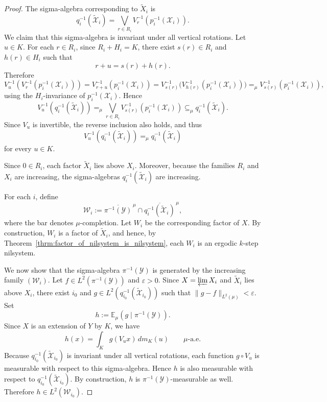 \documentclass[12pt]{amsart}
\theoremstyle{plain}
\theoremstyle{definition}
\newcommand\E{\mathbb{E}}
\newcommand\eps{\varepsilon}
\begin{document}
\begin{proof}
    The sigma-algebra corresponding to $\widetilde X_i$ is
    \[
    q_i^{-1}(\widetilde{\mathcal X}_i)
    = \bigvee_{r\in R_i} V_r^{-1}(p_i^{-1}(\mathcal X_i)).
    \]
    We claim that this sigma-algebra is invariant under all vertical rotations.
    Let $u\in K$.
    For each $r\in R_i$, since $R_i+H_i=K$, there exist $s(r)\in R_i$ and $h(r)\in H_i$ such that
    \[
    r+u=s(r)+h(r).
    \]
    Therefore
    \[
    V_u^{-1}(V_r^{-1}(p_i^{-1}(\mathcal X_i)))
    =V_{r+u}^{-1}(p_i^{-1}(\mathcal X_i))
    =V_{s(r)}^{-1}\bigl(V_{h(r)}^{-1}(p_i^{-1}(\mathcal X_i))\bigr)
    =_\mu V_{s(r)}^{-1}(p_i^{-1}(\mathcal X_i)),
    \]
    using the $H_i$-invariance of $p_i^{-1}(\mathcal X_i)$.
    Hence
    \[
    V_u^{-1}(q_i^{-1}(\widetilde{\mathcal X}_i))
    =_\mu \bigvee_{r\in R_i} V_{s(r)}^{-1}(p_i^{-1}(\mathcal X_i))
    \subseteq_\mu q_i^{-1}(\widetilde{\mathcal X}_i).
    \]
    Since $V_u$ is invertible, the reverse inclusion also holds, and thus
    \[
    V_u^{-1}(q_i^{-1}(\widetilde{\mathcal X}_i)) =_\mu q_i^{-1}(\widetilde{\mathcal X}_i)
    \]
    for every $u\in K$.

    Since $0\in R_i$, each factor $\widetilde X_i$ lies above $X_i$.
    Moreover, because the families $R_i$ and $X_i$ are increasing, the sigma-algebras $q_i^{-1}(\widetilde{\mathcal X}_i)$ are increasing.

    For each $i$, define
    \[
    \mathcal W_i
    := \overline{\pi^{-1}(\mathcal Y)}^{\,\mu}\cap
       \overline{q_i^{-1}(\widetilde{\mathcal X}_i)}^{\,\mu},
    \]
    where the bar denotes $\mu$-completion.
    Let $W_i$ be the corresponding factor of $X$.
    By construction, $W_i$ is a factor of $\widetilde X_i$, and hence, by Theorem~\ref{thrm:factor_of_nilsystem_is_nilsystem}, each $W_i$ is an ergodic $k$-step nilsystem.

    We now show that the sigma-algebra $\pi^{-1}(\mathcal Y)$ is generated by the increasing family $(\mathcal W_i)$.
    Let $f\in L^2(\pi^{-1}(\mathcal Y))$ and $\eps>0$.     Since $X=\varprojlim X_i$ and $\widetilde X_i$ lies above $X_i$, there exist $i_0$ and $ g\in L^2(q_{i_0}^{-1}(\widetilde{\mathcal X}_{i_0}))$ 
    such that $ \|g-f\|_{L^2(\mu)}<\eps$. 
    Set
    \[
    h:=\E_\mu(g\mid \pi^{-1}(\mathcal Y)).
    \]
    Since $X$ is an extension of $Y$ by $K$, we have
    \[
    h(x)=\int_K g(V_u x)\,dm_K(u)
    \qquad \mu\text{-a.e.}
    \]
    Because $q_{i_0}^{-1}(\widetilde{\mathcal X}_{i_0})$ is invariant under all vertical rotations, each function $g\circ V_u$ is measurable with respect to this sigma-algebra.
    Hence $h$ is also measurable with respect to $q_{i_0}^{-1}(\widetilde{\mathcal X}_{i_0})$.
    By construction, $h$ is $\pi^{-1}(\mathcal Y)$-measurable as well.
    Therefore $h\in L^2(\mathcal W_{i_0})$. 


\end{proof}
\end{document}
